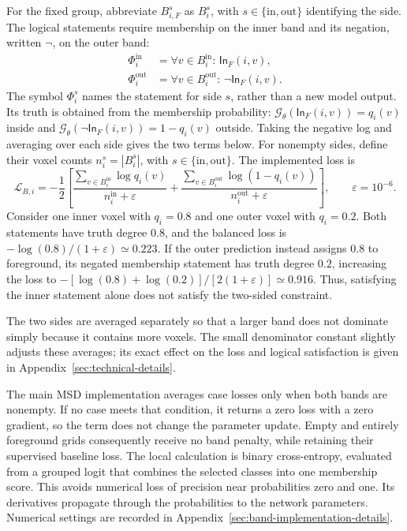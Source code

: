\documentclass[12pt,a4paper]{article}
\begin{document}
For the fixed group, abbreviate $B_{i,F}^s$ as $B_i^s$, with
$s\in\{\mathrm{in},\mathrm{out}\}$ identifying the side. The logical
statements require membership on the inner band and its negation,
written $\lnot$, on the outer band:
\begin{equation}
\begin{aligned}
\Phi_i^{\mathrm{in}}
 &=\forall v\in B_i^{\mathrm{in}}:\,\mathsf{In}_{F}(i,v),\\
\Phi_i^{\mathrm{out}}
 &=\forall v\in B_i^{\mathrm{out}}:\,\lnot\mathsf{In}_{F}(i,v).
\end{aligned}
\label{eq:band-logical-statements}
\end{equation}
The symbol $\Phi_i^s$ names the statement for side $s$, rather than a
new model output. Its truth is obtained from the membership probability:
$\mathcal G_\theta(\mathsf{In}_F(i,v))=q_i(v)$ inside and
$\mathcal G_\theta(\lnot\mathsf{In}_F(i,v))=1-q_i(v)$ outside.
Taking the negative log and averaging over each side gives the two terms
below. For nonempty sides, define their voxel counts
$n_i^s=|B_i^s|$, with $s\in\{\mathrm{in},\mathrm{out}\}$. The implemented loss is
\begin{equation}
\mathcal L_{B,i}=-\frac12\left[
\frac{\sum_{v\in B_i^{\mathrm{in}}}\log q_i(v)}{n_i^{\mathrm{in}}+\varepsilon}
+\frac{\sum_{v\in B_i^{\mathrm{out}}}\log(1-q_i(v))}{n_i^{\mathrm{out}}+\varepsilon}
\right],\qquad \varepsilon=10^{-6}.
\label{eq:balanced-band-loss}
\end{equation}
Consider one inner voxel with $q_i=0.8$ and one outer voxel with
$q_i=0.2$. Both statements have truth degree $0.8$, and the balanced
loss is $-\log(0.8)/(1+\varepsilon)\simeq0.223$. If the outer
prediction instead assigns $0.8$ to foreground, its negated membership
statement has truth degree $0.2$, increasing the loss to
$-[\log(0.8)+\log(0.2)]/[2(1+\varepsilon)]\simeq0.916$.
Thus, satisfying the inner statement alone does not satisfy the
two-sided constraint.

The two sides are averaged separately so that a larger band does not
dominate simply because it contains more voxels. The small denominator
constant slightly adjusts these averages; its exact effect on the loss
and logical satisfaction is given in Appendix~\ref{sec:technical-details}.

The main MSD implementation averages case losses only when both bands are
nonempty. If no case meets that condition, it returns a zero loss with a
zero gradient, so the term does not change the parameter update. Empty and
entirely foreground grids consequently receive no band penalty, while
retaining their supervised baseline loss. The local calculation is binary
cross-entropy, evaluated from a grouped logit that combines the selected
classes into one membership score. This avoids numerical loss of precision
near probabilities zero and one. Its derivatives propagate through the
probabilities to the network parameters. Numerical settings are recorded in
Appendix~\ref{sec:band-implementation-details}.
\end{document}
